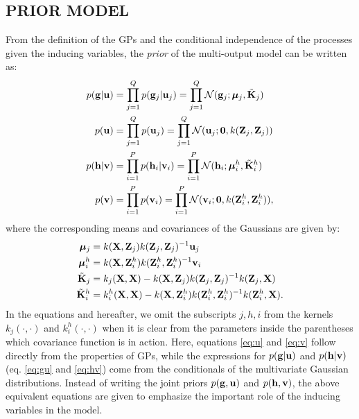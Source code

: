 \subsection{PRIOR MODEL}
From the definition of the GPs and the conditional independence of the processes given the inducing variables, 
the \emph{prior} of the multi-output model can be written as:
\begin{align}
\label{eq:gu}
p(\mathbf{g} | \mathbf{u}) &= \prod_{j=1}^Q p(\mathbf{g}_j | \mathbf{u}_j) = \prod_{j=1}^Q \mathcal{N}(\mathbf{g}_j; \boldsymbol{\mu}_j, \tilde{\mathbf{K}}_j )\\
\label{eq:u}
p(\mathbf{u}) &= \prod_{j=1}^Q p(\mathbf{u}_j) = \prod_{j=1}^Q \mathcal{N}(\mathbf{u}_j; \mathbf{0}, k(\mathbf{Z}_j, \mathbf{Z}_j)) \\
\label{eq:hv}
p(\mathbf{h} | \mathbf{v}) &= \prod_{i=1}^P p(\mathbf{h}_i | \mathbf{v}_i) = \prod_{i=1}^P \mathcal{N}(\mathbf{h}_i; \boldsymbol{\mu}^h_i, \tilde{\mathbf{K}}^h_i)\\
\label{eq:v}
p(\mathbf{v}) &= \prod_{i=1}^P p(\mathbf{v}_i) = \prod_{i=1}^P \mathcal{N}(\mathbf{v}_i; \mathbf{0}, k(\mathbf{Z}^h_i, \mathbf{Z}^h_i)),
\end{align}
where the corresponding means and covariances of the Gaussians are given by:
\begin{align}
 \boldsymbol{\mu}_j &= k(\mathbf{X},\mathbf{Z}_j)k(\mathbf{Z}_j,\mathbf{Z}_j)^{-1}\mathbf{u}_j \\
\boldsymbol{\mu}^h_i &= k(\mathbf{X},\mathbf{Z}^h_i)k(\mathbf{Z}^h_i,\mathbf{Z}^h_i)^{-1}\mathbf{v}_i \\
\tilde{\mathbf{K}}_j &= k_j(\mathbf{X},\mathbf{X}) - k(\mathbf{X},\mathbf{Z}_j)k(\mathbf{Z}_j,\mathbf{Z}_j)^{-1}k(\mathbf{Z}_j,\mathbf{X}) \\
\tilde{\mathbf{K}}^h_i &= k^h_i(\mathbf{X},\mathbf{X}) - k(\mathbf{X},\mathbf{Z}^h_i)k(\mathbf{Z}^h_i,\mathbf{Z}^h_i)^{-1}k(\mathbf{Z}^h_i,\mathbf{X}).
\end{align}
In the equations and hereafter, we omit the subscripts $j,h,i$ from the kernels $k_j(\cdot,\cdot)$ and $k^h_i(\cdot,\cdot)$ when it is clear from the parameters inside the parentheses which covariance function is in action.
Here, equations \ref{eq:u} and \ref{eq:v} follow directly from the properties of GPs, while the expressions for $p(\mathbf{g}|\mathbf{u})$ and $p(\mathbf{h}|\mathbf{v})$ (eq. \ref{eq:gu} and \ref{eq:hv}) come from the conditionals of the multivariate Gaussian distributions.
Instead of writing the joint priors $p(\mathbf{g},\mathbf{u})$ and $p(\mathbf{h},\mathbf{v})$, the above equivalent equations are given to emphasize the important role of the inducing variables in the model.
%
